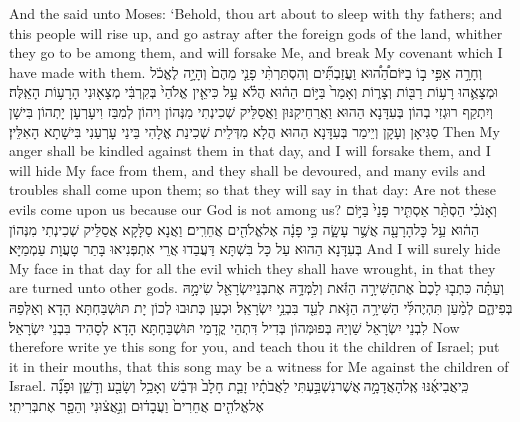 {And the \lord\space said unto Moses: ‘Behold, thou art about to sleep with thy fathers; and this people will rise up, and go astray after the foreign gods of the land, whither they go to be among them, and will forsake Me, and break My covenant which I have made with them.}{}
{וְחָרָ֣ה אַפִּ֣י ב֣וֹ בַיּוֹם\maqqaf הַ֠ה֠וּא וַעֲזַבְתִּ֞ים וְהִסְתַּרְתִּ֨י פָנַ֤י מֵהֶם֙ וְהָיָ֣ה לֶאֱכֹ֔ל וּמְצָאֻ֛הוּ רָע֥וֹת רַבּ֖וֹת וְצָר֑וֹת וְאָמַר֙ בַּיּ֣וֹם הַה֔וּא הֲלֹ֗א עַ֣ל כִּי\maqqaf אֵ֤ין אֱלֹהַי֙ בְּקִרְבִּ֔י מְצָא֖וּנִי הָרָע֥וֹת הָאֵֽלֶּה׃}
{וְיִתְקַף רוּגְזִי בְהוֹן בְּעִדָּנָא הַהוּא וַאֲרַחֵיקִנּוּן וַאֲסַלֵּיק שְׁכִינְתִי מִנְּהוֹן וִיהוֹן לְמִבַּז וִיעָרְעָן יָתְהוֹן בִּישָׁן סַגִּיאָן וְעָקָן וְיֵימַר בְּעִדָּנָא הַהוּא הֲלָא מִדְּלֵית שְׁכִינַת אֱלָהִי בֵּינַי עָרְעַנִי בִּישָׁתָא הָאִלֵּין׃}
{Then My anger shall be kindled against them in that day, and I will forsake them, and I will hide My face from them, and they shall be devoured, and many evils and troubles shall come upon them; so that they will say in that day: Are not these evils come upon us because our God is not among us?}{}
{וְאָנֹכִ֗י הַסְתֵּ֨ר אַסְתִּ֤יר פָּנַי֙ בַּיּ֣וֹם הַה֔וּא עַ֥ל כׇּל\maqqaf הָרָעָ֖ה אֲשֶׁ֣ר עָשָׂ֑ה כִּ֣י פָנָ֔ה אֶל\maqqaf אֱלֹהִ֖ים אֲחֵרִֽים׃}
{וַאֲנָא סַלָּקָא אֲסַלֵּיק שְׁכִינְתִי מִנְּהוֹן בְּעִדָּנָא הַהוּא עַל כָּל בִּשְׁתָּא דַּעֲבַדוּ אֲרֵי אִתְפְּנִיאוּ בָּתַר טָעֲוָת עַמְמַיָּא׃}
{And I will surely hide My face in that day for all the evil which they shall have wrought, in that they are turned unto other gods.}{}
{וְעַתָּ֗ה כִּתְב֤וּ לָכֶם֙ אֶת\maqqaf הַשִּׁירָ֣ה הַזֹּ֔את וְלַמְּדָ֥הּ אֶת\maqqaf בְּנֵי\maqqaf יִשְׂרָאֵ֖ל שִׂימָ֣הּ בְּפִיהֶ֑ם לְמַ֨עַן תִּהְיֶה\maqqaf לִּ֜י הַשִּׁירָ֥ה הַזֹּ֛את לְעֵ֖ד בִּבְנֵ֥י יִשְׂרָאֵֽל׃}
{וּכְעַן כְּתוּבוּ לְכוֹן יָת תּוּשְׁבַּחְתָּא הָדָא וְאַלְּפַהּ לִבְנֵי יִשְׂרָאֵל שַׁוְיַהּ בְּפוּמְּהוֹן בְּדִיל דִּתְהֵי קֳדָמַי תּוּשְׁבַּחְתָּא הָדָא לְסָהִיד בִּבְנֵי יִשְׂרָאֵל׃}
{Now therefore write ye this song for you, and teach thou it the children of Israel; put it in their mouths, that this song may be a witness for Me against the children of Israel.}{}
{כִּֽי\maqqaf אֲבִיאֶ֜נּוּ אֶֽל\maqqaf הָאֲדָמָ֣ה \legarmeh  אֲשֶׁר\maqqaf נִשְׁבַּ֣עְתִּי לַאֲבֹתָ֗יו זָבַ֤ת חָלָב֙ וּדְבַ֔שׁ וְאָכַ֥ל וְשָׂבַ֖ע וְדָשֵׁ֑ן וּפָנָ֞ה אֶל\maqqaf אֱלֹהִ֤ים אֲחֵרִים֙ וַעֲבָד֔וּם וְנִ֣אֲצ֔וּנִי וְהֵפֵ֖ר אֶת\maqqaf בְּרִיתִֽי׃}
